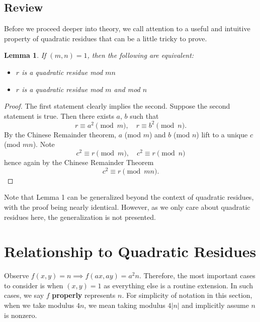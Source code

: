 \documentclass[12pt]{article}
\newtheorem{lemma}[theorem]{Lemma}
\begin{document}
\subsection{Review}
Before we proceed deeper into theory, we call attention to a useful and intuitive property of quadratic residues that can be a little tricky to prove.
\begin{lemma}
    If $(m, n) = 1$, then the following are equivalent:
    \begin{itemize}
        \item $r$ is a quadratic residue mod $mn$
        \item $r$ is a quadratic residue mod $m$ and mod $n$
    \end{itemize}
\end{lemma}
\begin{proof}
The first statement clearly implies the second. Suppose the second statement is true. Then there exists $a$, $b$ such that
\begin{equation*}
    r \equiv a^{2} \pmod{m}, \quad r \equiv b^{2} \pmod{n}.
\end{equation*}
By the Chinese Remainder theorem, $a$ (mod $m$) and $b$ (mod $n$) lift to a unique $c$ (mod $mn$). Note
\begin{equation*}
    c^{2} \equiv r \pmod{m}, \quad c^{2} \equiv r \pmod{n}
\end{equation*}
hence again by the Chinese Remainder Theorem
\begin{equation*}
    c^{2} \equiv r \pmod{mn}.
\end{equation*}
\end{proof}
Note that Lemma 1 can be generalized beyond the context of quadratic residues, with the proof being nearly identical. However, as we only care about quadratic residues here, the generalization is not presented. 

\section{Relationship to Quadratic Residues}
    Observe $f(x,y) = n \implies f(ax, ay) = a^{2}n$. Therefore, the most important cases to consider is when $(x,y) = 1$ as everything else is a routine extension. In such cases, we say $f$ \textbf{properly} represents $n$. For simplicity of notation in this section, when we take modulus $4n$, we mean taking modulus $4|n|$ and implicitly assume $n$ is nonzero. 
\end{document}
